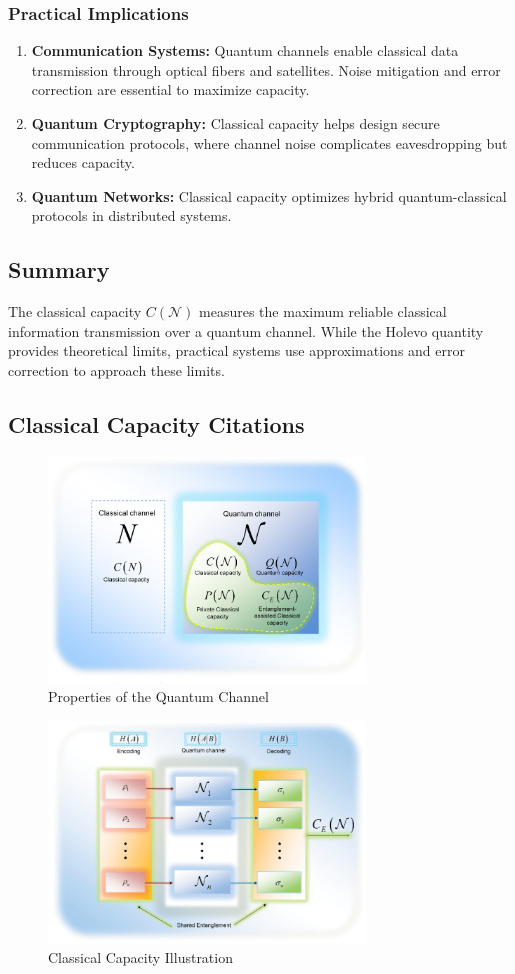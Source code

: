 \subsubsection{Practical Implications}
\begin{enumerate}
    \item \textbf{Communication Systems:} Quantum channels enable classical data transmission through optical fibers and satellites. Noise mitigation and error correction are essential to maximize capacity.
    \item \textbf{Quantum Cryptography:} Classical capacity helps design secure communication protocols, where channel noise complicates eavesdropping but reduces capacity.
    \item \textbf{Quantum Networks:} Classical capacity optimizes hybrid quantum-classical protocols in distributed systems.
\end{enumerate}

\subsection{Summary}
The classical capacity \(C(\mathcal{N})\) measures the maximum reliable classical information transmission over a quantum channel. While the Holevo quantity provides theoretical limits, practical systems use approximations and error correction to approach these limits.

\subsection{Classical Capacity Citations}
\begin{figure}[h]
    \centering
    \includegraphics[width=0.75\textwidth]{figures/properties_channels.png}
    \caption{Properties of the Quantum Channel \cite{Gyongyosi2012PropertiesOT}}
\end{figure}

\begin{figure}[h]
    \centering
    \includegraphics[width=0.75\textwidth]{figures/classical_cap.png}
    \caption{Classical Capacity Illustration \cite{6773024}}
\end{figure}
